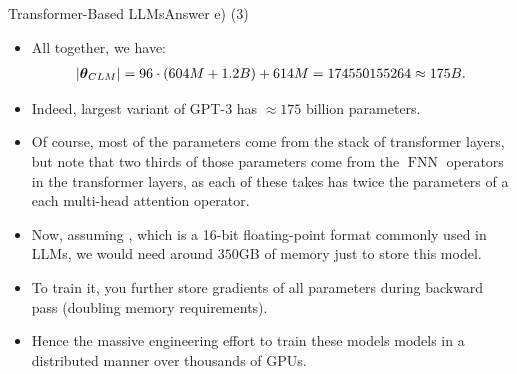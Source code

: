 \documentclass[t]{beamer}
\newcommand\op[1]{\operatorname{#1}}
\begin{document}
\begin{frame}{Transformer-Based LLMs}{Answer e) (3)}
    \begin{itemize}
        \item All together, we have:
              \begin{align*}
                  |{\boldsymbol{\theta}}_{CLM}| = 96\cdot (604M + 1.2B) + 614M = 174550155264 \approx 175B.
              \end{align*}
        \item Indeed, largest variant of GPT-3 has $\approx 175$ billion parameters.
        \item Of course, most of the parameters come from the stack of
              transformer layers, but note that two thirds of those parameters
              come from the $\op{FNN}$ operators in the transformer layers, as
              each of these takes has twice the parameters of a each multi-head
              attention operator.
        \item Now, assuming
              ,
              which is a 16-bit floating-point format commonly used in LLMs, we
              would need around $350$GB of memory just to store this model.
        \item To train it, you further store gradients of all parameters during
              backward pass (doubling memory requirements).
        \item Hence the massive engineering effort to train these models models
              in a distributed manner over thousands of GPUs.
    \end{itemize}
\end{frame}
\end{document}
